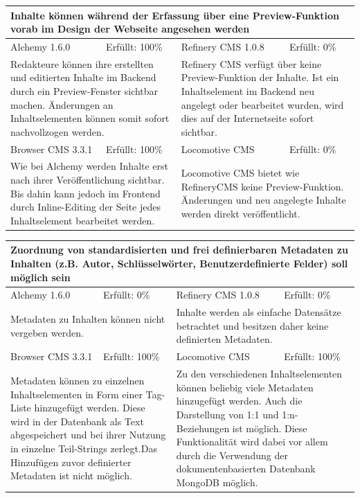 \begin{tabular}[!ht]{|l|l|l|l|}
\hline
\multicolumn{4}{|p{15cm}|}{\textbf{Inhalte können während der Erfassung über eine Preview-Funktion vorab im Design der Webseite angesehen werden}} \\
\hline
  Alchemy 1.6.0 & \cellcolor{green}Erfüllt: 100\% & Refinery CMS 1.0.8 & \cellcolor{red}Erfüllt: 0\% \\
  \hline
  \multicolumn{2}{|p{7.5cm}|}{Redakteure können ihre erstellten und editierten Inhalte im Backend durch ein Preview-Fenster sichtbar machen. Änderungen an Inhaltselementen können somit sofort nachvollzogen werden.}
   & \multicolumn{2}{p{7.5cm}|}{Refinery CMS verfügt über keine Preview-Funktion der Inhalte. Ist ein Inhaltselement im Backend neu angelegt oder bearbeitet wurden, wird dies auf der Internetseite sofort sichtbar.} \\
  \hline
  Browser CMS 3.3.1 & \cellcolor{green}Erfüllt: 100\% & Locomotive CMS & \cellcolor{red}Erfüllt: 0\% \\
  \hline
  \multicolumn{2}{|p{7.5cm}|}{Wie bei Alchemy werden Inhalte erst nach ihrer Veröffentlichung sichtbar. Bis dahin kann jedoch im Frontend durch Inline-Editing der Seite jedes Inhaltselement bearbeitet werden.} & \multicolumn{2}{p{7.5cm}|}{Locomotive CMS bietet wie RefineryCMS keine Preview-Funktion. Änderungen und neu angelegte Inhalte werden direkt veröffentlicht.} \\
\hline
\end{tabular}
\newline
\newline
\newline
\begin{tabular}[!ht]{|l|l|l|l|}
\hline
\multicolumn{4}{|p{15cm}|}{\textbf{Zuordnung von standardisierten und frei definierbaren Metadaten zu Inhalten (z.B. Autor, Schlüsselwörter, Benutzerdefinierte Felder) soll möglich sein}} \\
\hline
  Alchemy 1.6.0 & \cellcolor{red}Erfüllt: 0\% & Refinery CMS 1.0.8 & \cellcolor{red}Erfüllt: 0\% \\
  \hline
  \multicolumn{2}{|p{7.5cm}|}{Metadaten zu Inhalten können nicht vergeben werden.}
   & \multicolumn{2}{p{7.5cm}|}{Inhalte werden als einfache Datensätze betrachtet und besitzen daher keine definierten Metadaten.} \\
  \hline
  Browser CMS 3.3.1 & \cellcolor{green}Erfüllt: 100\% & Locomotive CMS & \cellcolor{green}Erfüllt: 100\% \\
  \hline
  \multicolumn{2}{|p{7.5cm}|}{Metadaten können zu einzelnen Inhaltselementen in Form einer Tag-Liste hinzugefügt werden. Diese wird in der Datenbank als Text abgespeichert und bei ihrer Nutzung in einzelne Teil-Strings zerlegt.Das Hinzufügen zuvor definierter Metadaten ist nicht möglich.} & \multicolumn{2}{p{7.5cm}|}{Zu den verschiedenen Inhaltselementen können beliebig viele Metadaten hinzugefügt werden. Auch die Darstellung von 1:1 und 1:n-Beziehungen ist möglich. Diese Funktionalität wird dabei vor allem durch die Verwendung der dokumentenbasierten Datenbank MongoDB möglich.} \\
\hline
\end{tabular}
